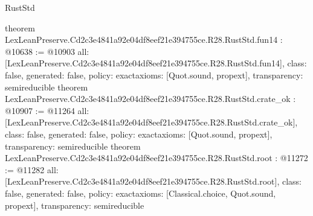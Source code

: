 \begin{lexlean}{RustStd}
\begin{coremodule}
{}
theorem LexLeanPreserve.Cd2c3e4841a92e04df8eef21e394755ce.R28.RustStd.fun14 : @10638 := @10903 {
  all: [LexLeanPreserve.Cd2c3e4841a92e04df8eef21e394755ce.R28.RustStd.fun14],
  class: false,
  generated: false,
  policy: exact{axioms: [Quot.sound, propext]},
  transparency: semireducible
}
theorem LexLeanPreserve.Cd2c3e4841a92e04df8eef21e394755ce.R28.RustStd.crate_ok : @10907 := @11264 {
  all: [LexLeanPreserve.Cd2c3e4841a92e04df8eef21e394755ce.R28.RustStd.crate_ok],
  class: false,
  generated: false,
  policy: exact{axioms: [Quot.sound, propext]},
  transparency: semireducible
}
theorem LexLeanPreserve.Cd2c3e4841a92e04df8eef21e394755ce.R28.RustStd.root : @11272 := @11282 {
  all: [LexLeanPreserve.Cd2c3e4841a92e04df8eef21e394755ce.R28.RustStd.root],
  class: false,
  generated: false,
  policy: exact{axioms: [Classical.choice, Quot.sound, propext]},
  transparency: semireducible
}


\end{coremodule}
\end{lexlean}
